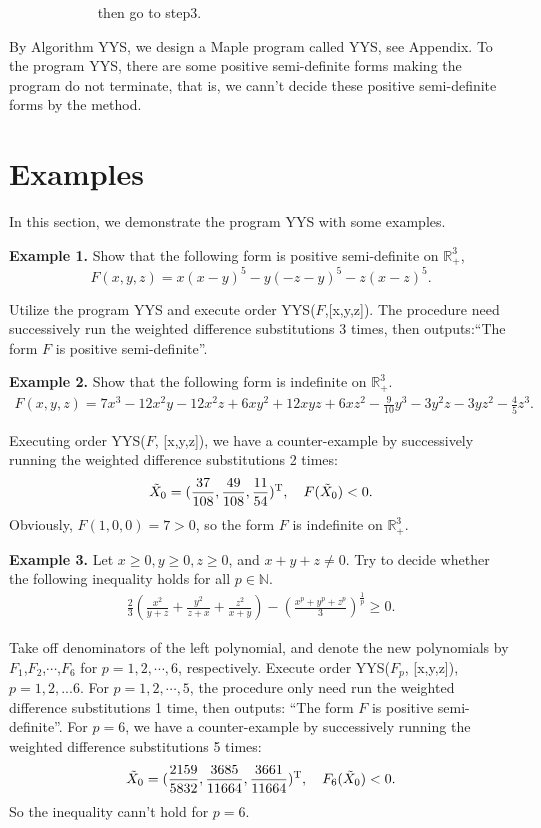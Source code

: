 \documentclass [10pt,a4paper]{article}
\begin{document}
~~~~~~~~~~~~ then go to step3.

By Algorithm YYS, we design  a Maple program called YYS, see
Appendix. To the program YYS,  there are some positive semi-definite
forms making the program do not terminate, that is, we cann't decide
these positive semi-definite forms by the method.


\section{Examples}


In this section, we demonstrate the program  YYS with some examples.


 \textbf{Example 1.} Show that the following form is positive semi-definite on
 $\mathbb{R}_{+}^3$,
 \begin{equation}
F(x,y,z)=x(x-y)^5-y(-z-y)^5-z(x-z)^5.
\end{equation}

Utilize the program YYS and execute order YYS($F$,[x,y,z]).  The
procedure need successively run the weighted dif\mbox{}ference
substitutions 3 times, then outputs:``The form $F$ is positive
semi-definite''.


\textbf{Example 2.} Show that the following form is
indef\mbox{}inite on $ \mathbb{R}_{+}^3$.
 \begin{equation}
\begin{split}
F(x,y,z)=7x^3-12x^2y-12x^2z+6xy^2+12xyz+6xz^2-\frac{9}{10}y^3-3y^2z-3yz^2-\frac{4}{5}z^3.
\end{split}
\end{equation}

   Executing order YYS($F$, [x,y,z]), we have a
counter-example by successively running the weighted
dif\mbox{}ference substitutions 2 times:
 $$\tilde{X}_0 =(
 \frac{37}{108}, \frac{49}{108},
 \frac{11}{54})^{\textmd{T}},
 \quad F(\tilde{X}_0)<0.$$
Obviously, $F(1,0,0)=7>0$, so the  form $F$ is indef\mbox{}inite on
$ \mathbb{R}_{+}^3$.


\textbf{Example 3.} Let $x\geq 0, y\geq 0, z\geq 0$, and $x+y+z\neq
0$. Try to decide whether the following inequality holds for all
$p\in\mathbb{N}$.
\begin{equation}\label{eq1}
\begin{split}
\frac{2}{3}(\frac{x^2}{y+z}+\frac{y^2}{z+x}+\frac{z^2}{x+y})-(\frac{x^p+y^p+z^p}{3})^{\frac{1}{p}}\geq
0.
\end{split}
\end{equation}


Take of\mbox{}f denominators of the left polynomial, and denote the
new polynomials by $F_1$,$F_2$,$\cdots$,$F_6$  for $p=1,
2,\cdots,6$, respectively. Execute order YYS($F_p$, [x,y,z]),
$p=1,2,...6$.  For $p=1, 2,\cdots,5$, the procedure only need run
the weighted dif\mbox{}ference substitutions 1 time, then outputs:
``The form $F$ is positive semi-definite''.  For $p=6$,  we have a
counter-example by successively running the weighted
dif\mbox{}ference substitutions 5 times:
 $$\tilde{X}_0 =(\frac{2159}{5832},
 \frac{3685}{11664},
 \frac{3661}{11664})^{\textmd{T}},
 \quad F_6(\tilde{X}_0)<0.$$ So
the  inequality cann't hold for $p=6$.
\end{document}
